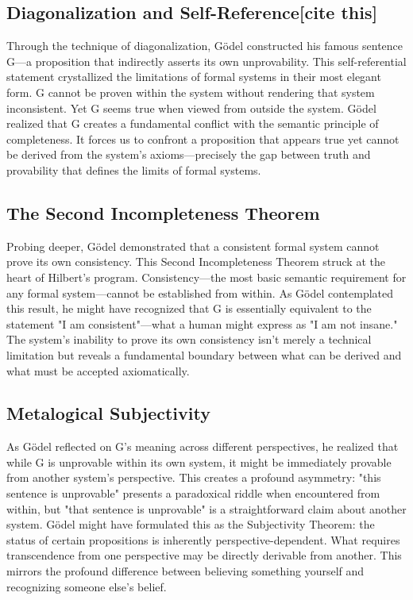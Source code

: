 \documentclass[runningheads]{llncs}
\begin{document}
\subsection{Diagonalization and Self-Reference[cite this]}

Through the technique of diagonalization, Gödel constructed his famous sentence G—a proposition that indirectly asserts its own unprovability. This self-referential statement crystallized the limitations of formal systems in their most elegant form. G cannot be proven within the system without rendering that system inconsistent. Yet G seems true when viewed from outside the system. Gödel realized that G creates a fundamental conflict with the semantic principle of completeness. It forces us to confront a proposition that appears true yet cannot be derived from the system's axioms—precisely the gap between truth and provability that defines the limits of formal systems.

\subsection{The Second Incompleteness Theorem}

Probing deeper, Gödel demonstrated that a consistent formal system cannot prove its own consistency. This Second Incompleteness Theorem struck at the heart of Hilbert's program. Consistency—the most basic semantic requirement for any formal system—cannot be established from within. As Gödel contemplated this result, he might have recognized that G is essentially equivalent to the statement "I am consistent"—what a human might express as "I am not insane." The system's inability to prove its own consistency isn't merely a technical limitation but reveals a fundamental boundary between what can be derived and what must be accepted axiomatically.

\subsection{Metalogical Subjectivity}

As Gödel reflected on G's meaning across different perspectives, he realized that while G is unprovable within its own system, it might be immediately provable from another system's perspective. This creates a profound asymmetry: "this sentence is unprovable" presents a paradoxical riddle when encountered from within, but "that sentence is unprovable" is a straightforward claim about another system. Gödel might have formulated this as the Subjectivity Theorem: the status of certain propositions is inherently perspective-dependent. What requires transcendence from one perspective may be directly derivable from another. This mirrors the profound difference between believing something yourself and recognizing someone else's belief.
\end{document}
